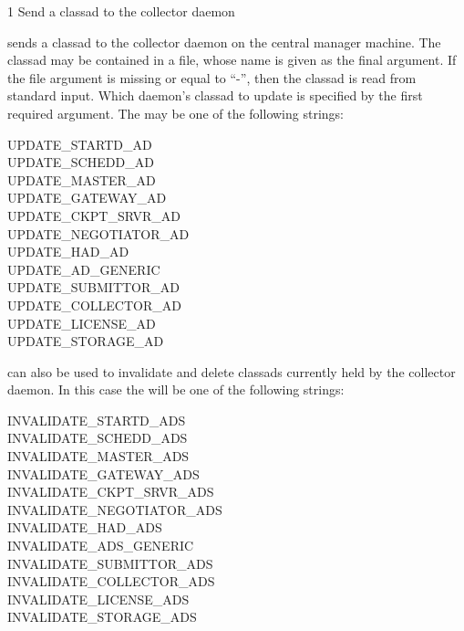 \begin{ManPage}{\label{man-condor-advertise}}{1}
{Send a classad to the collector daemon}
\Synopsis {}
\ToolArgsBase
{}


\Description
{} sends a classad to the collector daemon on
the central manager machine.
The classad may be contained in a file,
whose name is given as the final argument. If the file
argument is missing or equal to ``-'', then the classad is read
from standard input.
Which daemon's classad to update is specified by the first
required argument.
The  may be one of the following strings:
\begin{description}
\item[UPDATE\_STARTD\_AD]
\item[UPDATE\_SCHEDD\_AD]
\item[UPDATE\_MASTER\_AD]
\item[UPDATE\_GATEWAY\_AD]
\item[UPDATE\_CKPT\_SRVR\_AD]
\item[UPDATE\_NEGOTIATOR\_AD]
\item[UPDATE\_HAD\_AD]
\item[UPDATE\_AD\_GENERIC]
\item[UPDATE\_SUBMITTOR\_AD]
\item[UPDATE\_COLLECTOR\_AD]
\item[UPDATE\_LICENSE\_AD]
\item[UPDATE\_STORAGE\_AD]
\end{description}

 can also be used to invalidate and delete
classads currently held by the collector daemon.  In this case
the  will be one of the following strings:
\begin{description}
\item[INVALIDATE\_STARTD\_ADS]
\item[INVALIDATE\_SCHEDD\_ADS]
\item[INVALIDATE\_MASTER\_ADS]
\item[INVALIDATE\_GATEWAY\_ADS]
\item[INVALIDATE\_CKPT\_SRVR\_ADS]
\item[INVALIDATE\_NEGOTIATOR\_ADS]
\item[INVALIDATE\_HAD\_ADS]
\item[INVALIDATE\_ADS\_GENERIC]
\item[INVALIDATE\_SUBMITTOR\_ADS]
\item[INVALIDATE\_COLLECTOR\_ADS]
\item[INVALIDATE\_LICENSE\_ADS]
\item[INVALIDATE\_STORAGE\_ADS]
\end{description}


\end{ManPage}

